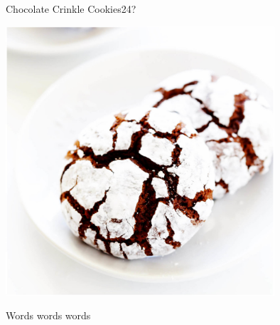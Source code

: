 \begin{recipe}{Chocolate Crinkle Cookies}{24?}{}

    \freeform \begin{center}
        \includegraphics[width=10cm, height=10cm, keepaspectratio]{recipes/images/Chocolate-Crinkle-Cookies-Recipe-3-1.jpg}
    \end{center}



    Words words words
\end{recipe}
